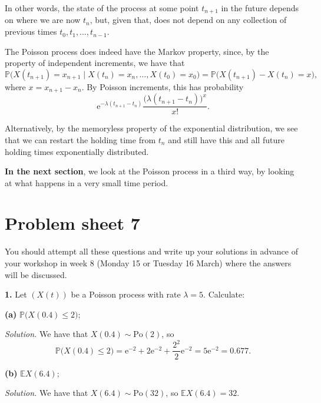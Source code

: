 \documentclass[
  a4paper,
]{article}
\newif\ifcomm\commtrue
\theoremstyle{definition}
\theoremstyle{definition}
\theoremstyle{definition}
\theoremstyle{remark}
\begin{document}
In other words, the state of the process at some point \(t_{n+1}\) in the future depends on where we are now \(t_n\), but, given that, does not depend on any collection of previous times \(t_0, t_1, \dots, t_{n-1}\).

The Poisson process does indeed have the Markov property, since, by the property of independent increments, we have that
\[ \mathbb P\big( X(t_{n+1}) = x_{n+1} \mid X(t_n) = x_n, \dots, X(t_0) = x_0 \big) = \mathbb P\big( X(t_{n+1}) -X(t_n) = x\big) , \]
where \(x = x_{n+1}-x_n\). By Poisson increments, this has probability
\[ \mathrm{e}^{-\lambda(t_{n+1}-t_n)} \frac{\big(\lambda(t_{n+1}-t_n)\big)^x}{x!} . \]

Alternatively, by the memoryless property of the exponential distribution, we see that we can restart the holding time from \(t_n\) and still have this and all future holding times exponentially distributed.

\textbf{In the next section}, we look at the Poisson process in a third way, by looking at what happens in a very small time period.

\hypertarget{P07}{%
\section*{Problem sheet 7}\label{P07}}

\commtrue

You should attempt all these questions and write up your solutions in advance of your workshop in week 8 (Monday 15 or Tuesday 16 March) where the answers will be discussed.

\textbf{1.} Let \((X(t))\) be a Poisson process with rate \(\lambda = 5\). Calculate:

\textbf{(a)} \(\mathbb P\big(X(0.4) \leq 2\big)\);

\begin{myanswers}
\emph{Solution.}
We have that \(X(0.4) \sim \text{Po}(2)\), so
\[ \mathbb P\big(X(0.4) \leq 2\big) = \mathrm{e}^{-2} + 2\mathrm{e}^{-2} + \frac{2^2}{2} \mathrm{e}^{-2} = 5 \mathrm{e}^{-2} = 0.677 .\]

\end{myanswers}

\textbf{(b)} \(\mathbb EX(6.4)\);

\begin{myanswers}
\emph{Solution.} We have that \(X(6.4) \sim \text{Po}(32)\), so \(\mathbb E X(6.4) = 32\).

\end{myanswers}
\end{document}
